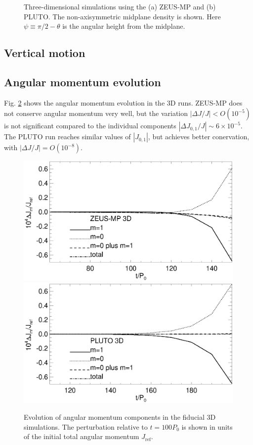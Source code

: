 \begin{figure}
\begin{center}
{    }
  \end{center}
  \caption{Three-dimensional simulations using the (a) ZEUS-MP and (b)
    PLUTO. The non-axisymmetric midplane density is shown. Here $\psi
    \equiv \pi/2 - \theta$ is the angular height 
    from the midplane.\label{3d_prelim}}   
\end{figure}

\subsection{Vertical motion}

\subsection{Angular momentum evolution}

Fig. \ref{3d_angmom} shows the angular momentum evolution in the 3D
runs. ZEUS-MP does not conserve angular momentum very well, but
the variation $|\Delta J/J|< O(10^{-5})$ is not significant compared
to the individual components $|\Delta J_{0,1}/J|\sim 
6\times10^{-5}$. The PLUTO run reaches similar values of
$|J_{0,1}|$, but achieves better conervation, with $|\Delta
J/J|=O(10^{-8})$. 



\begin{figure}
  \includegraphics[scale=.41,clip=true,trim=0cm 1cm 0cm 0cm]{figures/nonaxi_evol_ang_zeus}
  \includegraphics[scale=.41]{figures/nonaxi_evol_ang_pluto}
  \caption{Evolution of angular momentum components in the fiducial 3D 
    simulations. The perturbation
    relative to $t=100P_0$ is shown in units of the
    initial total angular momentum $J_\mathrm{ref}$.\label{3d_angmom}} 
\end{figure}   

